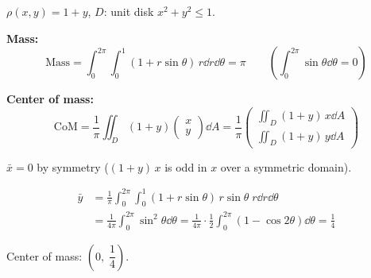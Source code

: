 \begin{example}
  $\rho(x,y)=1+y$, \; $D$: unit disk $x^2+y^2\le 1$.

  \begin{center}
  \end{center}

  \textbf{Mass:}
  \[
    \text{Mass}
    = \int_0^{2\pi}\!\int_0^1(1+r\sin\theta)\,r\dd{r}\dd{\theta}
    = \pi
    \qquad\left(\textstyle\int_0^{2\pi}\sin\theta\dd{\theta}=0\right)
  \]

  \textbf{Center of mass:}
  \[
    \text{CoM}
    = \frac{1}{\pi}\iint_D(1+y)
    \begin{pmatrix}
      x \\y
    \end{pmatrix}
    \dd{A}
    = \frac{1}{\pi}
    \begin{pmatrix}
      \iint_D(1+y)\,x\dd{A} \\[4pt]
      \iint_D(1+y)\,y\dd{A}
    \end{pmatrix}
  \]

  $\bar{x}=0$ by symmetry
  ($(1+y)\,x$ is odd in $x$ over a symmetric domain).

  \begin{align*}
    \bar{y}
     & = \frac{1}{\pi}\int_0^{2\pi}\!\int_0^1
    (1+r\sin\theta)\,r\sin\theta\;r\dd{r}\dd{\theta}          \\
     & = \frac{1}{4\pi}\int_0^{2\pi}\sin^2\!\theta\dd{\theta}
    = \frac{1}{4\pi}\cdot\frac{1}{2}
    \int_0^{2\pi}(1-\cos 2\theta)\dd{\theta}
    = \frac{1}{4}
  \end{align*}

  Center of mass: $\left(0,\;\dfrac{1}{4}\right)$.
\end{example}
